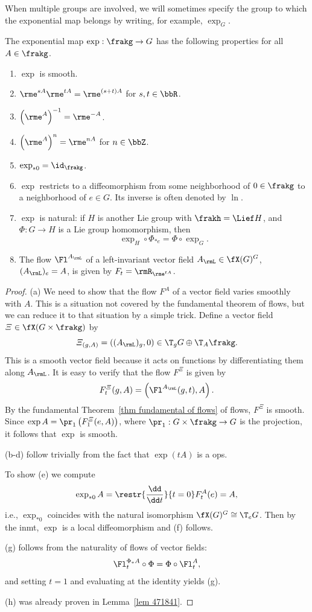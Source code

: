 When multiple groups are involved, we will sometimes specify the group to which the exponential map belongs by writing, for example, $\exp_G$.

\begin{prop}\label{prop properties of exp} The exponential map $\exp:\frakg\to G$ has the following properties for all $A\in\frakg$.
\begin{enumerate}[label=(\alph*)]
    \item $\exp$ is smooth.
    \item $\rme^{sA}\rme^{tA}=\rme^{(s+t)A}$ for $s,t\in\bbR$.
    \item $\left(\rme^A\right)^{-1}=\rme^{-A}$.
    \item $\left(\rme^A\right)^{n}=\rme^{nA}$ for $n\in \bbZ$.
    \item $\exp_{\ast 0}=\id_\frakg$.
    \item $\exp$ restricts to a diffeomorphism from some neighborhood of $0\in \frakg$ to a neighborhood of $e\in G$. Its inverse is often denoted by $\ln$.
    \item $\exp$ is natural: if $H$ is another Lie group with $\frakh=\Lief H$, and $\Phi:G\to H$ is a Lie group homomorphism, then 
    \[\exp_H\circ\Phi_{\ast e}=\Phi\circ \exp_G.\]
    \item The flow $\Fl^{A_\rmL}$ of a left-invariant vector field $A_\rmL\in \fX(G)^G$, $(A_\rmL)_e=A$, is given by $F_t=\rmR_{\rme^{tA}}$.
\end{enumerate}
\end{prop}
\begin{proof}
    (a) We need to show that the flow $F^A$ of a vector field varies smoothly with $A$. This is a situation not covered by the fundamental theorem of flows, but we can reduce it to that situation by a simple trick. Define a vector field $\varXi\in\fX(G\times\frakg)$ by
    \[\varXi_{(g,A)}=((A_\rmL)_g,0)\in \T_gG\oplus \T_A \frakg.\]
    This is a smooth vector field because it acts on functions by differentiating them along $A_\rmL$. It is easy to verify that the flow $F^\varXi$ is given by
    \[F^\varXi_t(g,A)=\left(\Fl^{A_\rmL}(g,t),A\right).\]
    By the fundamental Theorem~\ref{thm fundamental of flows} of flows, $F^\varXi$ is smooth. Since $\exp A=\pr_1\left(F^\varXi_1(e,A)\right)$, where $\pr_1:G\times\frakg\to G$ is the projection, it follows that $\exp$ is smooth.

    (b-d) follow trivially from the fact that $\exp(tA)$ is a \gls{ops}.
    
    To show (e) we compute
    \[\exp_{\ast 0}A=\restr{\frac{\dd}{\dd t}}{t=0}F_t^{A}(e)=A,\]
    i.e., $\exp_{\ast 0}$ coincides with the natural isomorphism $\fX(G)^G\cong \T_e G$. Then by the \gls{inmt}, $\exp$ is a local diffeomorphism and (f) follows.

    (g) follows from the naturality of flows of vector fields:
    \[\Fl^{\Phi_\ast A}_t\circ \Phi=\Phi\circ \Fl^{A}_t,\]
    and setting $t=1$ and evaluating at the identity yields (g).

    (h) was already proven in Lemma~\ref{lem 471841}.
\end{proof}

